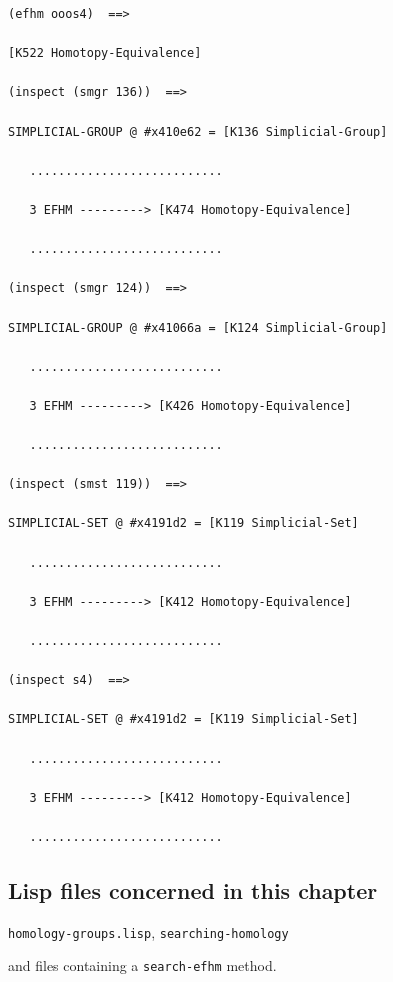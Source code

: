 {\begin{verbatim}
(efhm ooos4)  ==>

[K522 Homotopy-Equivalence]

(inspect (smgr 136))  ==>

SIMPLICIAL-GROUP @ #x410e62 = [K136 Simplicial-Group]

   ...........................

   3 EFHM ---------> [K474 Homotopy-Equivalence]

   ...........................

(inspect (smgr 124))  ==>

SIMPLICIAL-GROUP @ #x41066a = [K124 Simplicial-Group]

   ...........................

   3 EFHM ---------> [K426 Homotopy-Equivalence]

   ...........................

(inspect (smst 119))  ==>

SIMPLICIAL-SET @ #x4191d2 = [K119 Simplicial-Set]

   ...........................

   3 EFHM ---------> [K412 Homotopy-Equivalence]

   ...........................

(inspect s4)  ==>

SIMPLICIAL-SET @ #x4191d2 = [K119 Simplicial-Set]

   ...........................

   3 EFHM ---------> [K412 Homotopy-Equivalence]

   ...........................

\end{verbatim}}



\subsection* {Lisp files concerned in this chapter}

{\tt homology-groups.lisp}, {\tt searching-homology}\par
and files containing a {\tt search-efhm} method.
